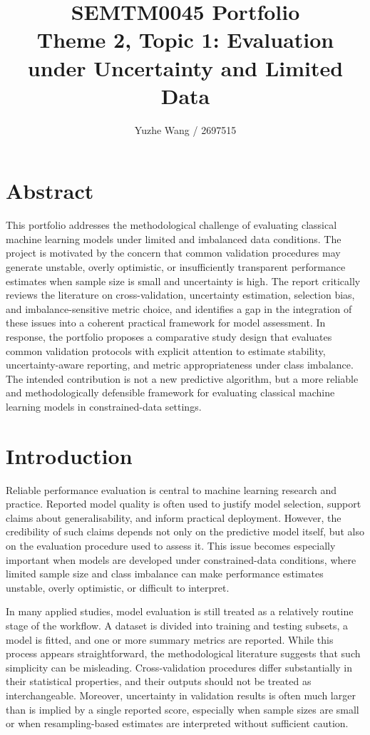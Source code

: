 \documentclass[11pt,a4paper]{article}
\title{\textbf{SEMTM0045 Portfolio}\\Theme 2, Topic 1: Evaluation under Uncertainty and Limited Data}
\author{Yuzhe Wang / 2697515}
\date{}
\begin{document}
\maketitle

\section{Abstract}

This portfolio addresses the methodological challenge of evaluating classical machine learning models under limited and imbalanced data conditions. The project is motivated by the concern that common validation procedures may generate unstable, overly optimistic, or insufficiently transparent performance estimates when sample size is small and uncertainty is high. The report critically reviews the literature on cross-validation, uncertainty estimation, selection bias, and imbalance-sensitive metric choice, and identifies a gap in the integration of these issues into a coherent practical framework for model assessment. In response, the portfolio proposes a comparative study design that evaluates common validation protocols with explicit attention to estimate stability, uncertainty-aware reporting, and metric appropriateness under class imbalance. The intended contribution is not a new predictive algorithm, but a more reliable and methodologically defensible framework for evaluating classical machine learning models in constrained-data settings.

\section{Introduction}

Reliable performance evaluation is central to machine learning research and practice. Reported model quality is often used to justify model selection, support claims about generalisability, and inform practical deployment. However, the credibility of such claims depends not only on the predictive model itself, but also on the evaluation procedure used to assess it. This issue becomes especially important when models are developed under constrained-data conditions, where limited sample size and class imbalance can make performance estimates unstable, overly optimistic, or difficult to interpret.

In many applied studies, model evaluation is still treated as a relatively routine stage of the workflow. A dataset is divided into training and testing subsets, a model is fitted, and one or more summary metrics are reported. While this process appears straightforward, the methodological literature suggests that such simplicity can be misleading. Cross-validation procedures differ substantially in their statistical properties, and their outputs should not be treated as interchangeable. Moreover, uncertainty in validation results is often much larger than is implied by a single reported score, especially when sample sizes are small or when resampling-based estimates are interpreted without sufficient caution.
\end{document}
